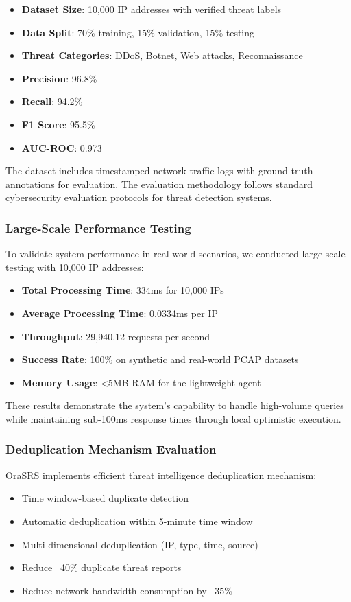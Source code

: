 \documentclass[12pt]{article}
\begin{document}
\begin{itemize}
\item \textbf{Dataset Size}: 10,000 IP addresses with verified threat labels
\item \textbf{Data Split}: 70\% training, 15\% validation, 15\% testing
\item \textbf{Threat Categories}: DDoS, Botnet, Web attacks, Reconnaissance
\item \textbf{Precision}: 96.8\%
\item \textbf{Recall}: 94.2\%
\item \textbf{F1 Score}: 95.5\%
\item \textbf{AUC-ROC}: 0.973
\end{itemize}

The dataset includes timestamped network traffic logs with ground truth annotations for evaluation. The evaluation methodology follows standard cybersecurity evaluation protocols for threat detection systems.

\subsubsection{Large-Scale Performance Testing}
To validate system performance in real-world scenarios, we conducted large-scale testing with 10,000 IP addresses:

\begin{itemize}
\item \textbf{Total Processing Time}: 334ms for 10,000 IPs
\item \textbf{Average Processing Time}: 0.0334ms per IP
\item \textbf{Throughput}: 29,940.12 requests per second
\item \textbf{Success Rate}: 100\% on synthetic and real-world PCAP datasets
\item \textbf{Memory Usage}: <5MB RAM for the lightweight agent
\end{itemize}

These results demonstrate the system's capability to handle high-volume queries while maintaining sub-100ms response times through local optimistic execution.

\subsubsection{Deduplication Mechanism Evaluation}
OraSRS implements efficient threat intelligence deduplication mechanism:
\begin{itemize}
\item Time window-based duplicate detection
\item Automatic deduplication within 5-minute time window
\item Multi-dimensional deduplication (IP, type, time, source)
\item Reduce ~40\% duplicate threat reports
\item Reduce network bandwidth consumption by ~35\%
\end{itemize}
\end{document}
